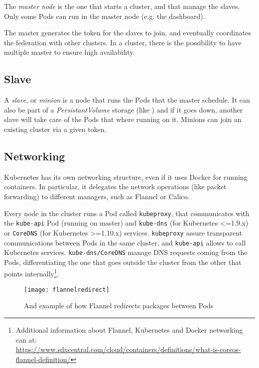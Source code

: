 The \emph{master node} is the one that starts a cluster, and that manage the
slaves. Only some Pods can run in the master node (e.g. the dashboard).

The master generates the token for the slaves to join, and eventually
coordinates the federation with other clusters. In a cluster, there is the
possibility to have multiple master to ensure high availability.

\subsection{Slave}
\label{slave}

A \emph{slave}, or \emph{minion} is a node that runs the Pods that the master
schedule. It can also be part of a \emph{PersistantVolume} storage (like
\gluster{}) and if it goes down, another slave will take care of the Pods that
where running on it. Minions can join an existing cluster via a given token.

\subsection{Networking}
\label{networking}

Kubernetes has its own networking structure, even if it uses Docker for running
containers. In particular, it delegates the network operations (like packet
forwarding) to different managers, such as Flannel or Calico.

Every node in the cluster runs a Pod called \texttt{kubeproxy}, that
communicates with the \texttt{kube-api} Pod (running on master) and
\texttt{kube-dns} (for Kubernetes \textless{}=1.9.x) or \texttt{CoreDNS} (for
Kubernetes \textgreater{}=1.10.x) services. \texttt{kubeproxy} assure
transparent communications between Pods in the same cluster, and
\texttt{kube-api} allows to call Kubernetes services. \texttt{kube-dns/CoreDNS}
manage DNS requests coming from the Pods, differentiating the one that goes
outside the cluster from the other that points internally\footnote{Additional
  information about Flannel, Kubernetes and Docker networking can at:\\\sloppy
  \url{https://www.sdxcentral.com/cloud/containers/definitions/what-is-coreos-flannel-definition/}}.

\begin{figure}[htbp]
\centering
\texttt{[image: flannelredirect]}
\caption{And example of how Flannel redirects packages between Pods}
\end{figure}




